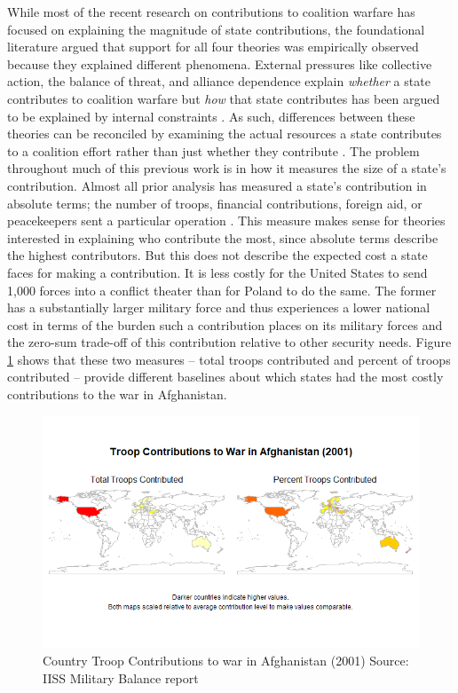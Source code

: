 \documentclass[12pt,letterpaper]{article}
\begin{document}
		While most of the recent research on contributions to coalition warfare has focused on explaining the magnitude of state contributions, the foundational literature argued that support for all four theories was empirically observed because they explained different phenomena. External pressures like collective action, the balance of threat, and alliance dependence explain \textit{whether} a state contributes to coalition warfare but \textit{how} that state contributes has been argued to be explained by internal constraints \citep{bennett_burdensharingpersiangulf_1994}. As such, differences between these theories can be reconciled by examining the actual resources a state contributes to a coalition effort rather than just whether they contribute \citep{cranmer_coalitionqualitymultinational_2017}. The problem throughout much of this previous work is in how it measures the size of a state's contribution. Almost all prior analysis has measured a state's contribution in absolute terms; the number of troops, financial contributions, foreign aid, or peacekeepers sent a particular operation \citep{mello_democraticparticipationarmed_2014, haesebrouck_explainingmemberstates_2016}. This measure makes sense for theories interested in explaining who contribute the most, since absolute terms describe the highest contributors. But this does not describe the expected cost a state faces for making a contribution. It is less costly for the United States to send 1,000 forces into a conflict theater than for Poland to do the same. The former has a substantially larger military force and thus experiences a lower national cost in terms of the burden such a contribution places on its military forces and the zero-sum trade-off of this contribution relative to other security needs. Figure \ref{fig:contrib_map} shows that these two measures -- total troops contributed and percent of troops contributed -- provide different baselines about which states had the most costly contributions to the war in Afghanistan.

		\begin{figure}[H]
			\centering
			\includegraphics[width=\textwidth]{troops_2001_sidebyside_scaled.png}
			\caption{Country Troop Contributions to war in Afghanistan (2001) Source: IISS Military Balance report}
			\label{fig:contrib_map}
		\end{figure}
\end{document}
